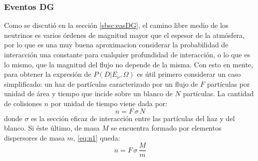 	
	\subsubsection{Eventos DG}
	
	Como se discuti\'o en la sección \ref{sbsc:easDG}, el camino libre medio de los neutrinos es varios órdenes de magnitud mayor que el espesor de la atmósfera, por lo que es una muy buena aproximacion considerar la probabilidad de interacción una constante para cualquier profundidad de interacción, o lo que es lo mismo, que la magnitud del flujo no depende de la misma.
	Con esto en mente, para obtener la expresión de $P(D|E_{\nu},\Omega)$ es útil primero considerar un caso simplificado: un haz de partículas caracterizado por un flujo de $F$ partículas por unidad de área y tiempo que incide sobre un blanco de $N$ part\'iculas. La cantidad de colisiones $n$ por unidad de tiempo viene dada por:
	\begin{equation}
	n = F\,\sigma\,N
	\label{eq:n1}
	\end{equation}
	donde $\sigma$ es la sección eficaz de interacción entre las part\'iculas del haz y del blanco.
	Si \'este \'ultimo, de masa $M$ se encuentra formado por elementos dispersores de masa $m$, \ref{eq:n1} queda:
	\begin{equation}
	n = F\,\sigma\,\frac{M}{m}
	\end{equation}


